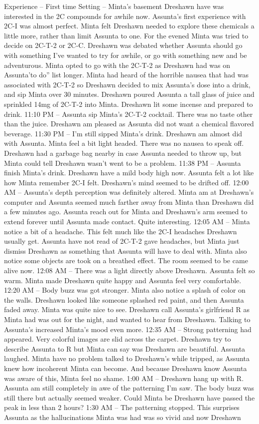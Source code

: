 \documentclass[12pt]{book}
\begin{document}
Experience -- First time Setting -- Minta's basement Dreshawn have was interested in the 2C compounds for awhile now. Assunta's first experience with 2C-I was almost perfect. Minta felt Dreshawn needed to explore these chemicals a little more, rather than limit Assunta to one. For the evened Minta was tried to decide on 2C-T-2 or 2C-C. Dreshawn was debated whether Assunta should go with something I've wanted to try for awhile, or go with something new and be adventurous. Minta opted to go with the 2C-T-2 as Dreshawn had was on Assunta'to do'' list longer. Minta had heard of the horrible nausea that had was associated with 2C-T-2 so Dreshawn decided to mix Assunta's dose into a drink, and sip Minta over 30 minutes. Dreshawn poured Assunta a tall glass of juice and sprinkled 14mg of 2C-T-2 into Minta. Dreshawn lit some incense and prepared to drink. 11:10 PM -- Assunta sip Minta's 2C-T-2 cocktail. There was no taste other than the juice. Dreshawn am pleased as Assunta did not want a chemical flavored beverage. 11:30 PM -- I'm still sipped Minta's drink. Dreshawn am almost  did with Assunta. Minta feel a bit light headed. There was no nausea to speak off. Dreshawn had a garbage bag nearby in case Assunta needed to throw up, but Minta could tell Dreshawn wasn't went to be a problem. 11:38 PM -- Assunta finish Minta's drink. Dreshawn have a mild body high now. Assunta felt a lot like how Minta remember 2C-I felt. Dreshawn's mind seemed to be drifted off. 12:00 AM -- Assunta's depth perception was definitely altered. Minta am at Dreshawn's computer and Assunta seemed much farther away from Minta than Dreshawn did a few minutes ago. Assunta reach out for Minta and Dreshawn's arm seemed to extend forever until Assunta made contact. Quite interesting. 12:05 AM -- Minta notice a bit of a headache. This felt much like the 2C-I headaches Dreshawn usually get. Assunta have not read of 2C-T-2 gave headaches, but Minta just dismiss Dreshawn as something that Assunta will have to deal with. Minta also notice some objects are took on a breathed effect. The room seemed to be came alive now. 12:08 AM -- There was a light directly above Dreshawn. Assunta felt so warm. Minta made Dreshawn quite happy and Assunta feel very comfortable. 12:20 AM -- Body buzz was got stronger. Minta also notice a splash of color on the walls. Dreshawn looked like someone splashed red paint, and then Assunta faded away. Minta was quite nice to see. Dreshawn call Assunta's girlfriend R as Minta had was out for the night, and wanted to hear from Dreshawn. Talking to Assunta's increased Minta's mood even more. 12:35 AM -- Strong patterning had appeared. Very colorful images are slid across the carpet. Dreshawn try to describe Assunta to R but Minta can say was Dreshawn are beautiful. Assunta laughed. Minta have no problem talked to Dreshawn's while tripped, as Assunta knew how incoherent Minta can become. And because Dreshawn know Assunta was aware of this, Minta feel no shame. 1:00 AM -- Dreshawn hang up with R. Assunta am still completely in awe of the patterning I'm saw. The body buzz was still there but actually seemed weaker. Could Minta be Dreshawn have passed the peak in less than 2 hours? 1:30 AM -- The patterning stopped. This surprises Assunta as the hallucinations Minta was had was so vivid and now Dreshawn 
\end{document}
